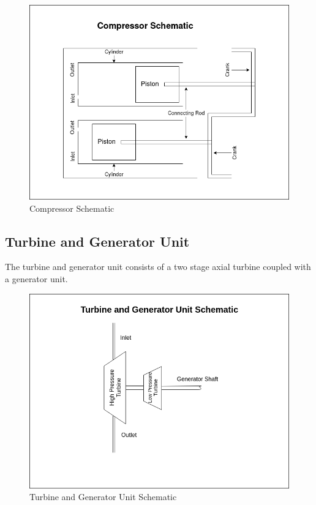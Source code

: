 \documentclass[12pt,a4paper]{article}
\begin{document}
		\begin{figure}[H]
			\centering
			\includegraphics[width=1\textwidth]{images/compressor-schematic.png}
			\caption{Compressor Schematic}
			\label{fig:compressor_schematic}
		\end{figure}

	\subsection{Turbine and Generator Unit}
		The turbine and generator unit consists of a two stage axial turbine coupled with a generator unit.

		\begin{figure}[H]
			\centering
			\includegraphics[width=1\textwidth]{images/turbine-and-generator-unit-schematic.png}
			\caption{Turbine and Generator Unit Schematic}
			\label{fig:turbine_and_generator_unit_schematic}
		\end{figure}
\end{document}
